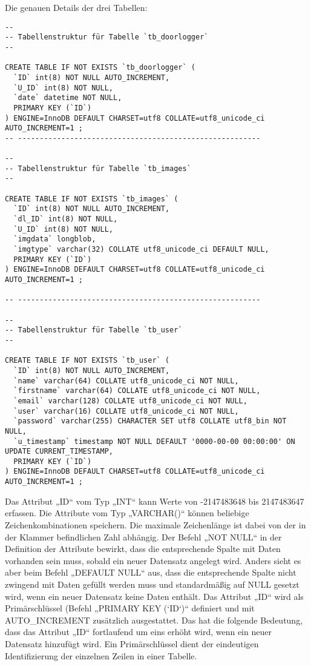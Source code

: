 Die genauen Details der drei Tabellen:
\begin{lstlisting}[caption={Aufbau der Datenbanktabellen},captionpos=b]
--
-- Tabellenstruktur für Tabelle `tb_doorlogger`
--

CREATE TABLE IF NOT EXISTS `tb_doorlogger` (
  `ID` int(8) NOT NULL AUTO_INCREMENT,
  `U_ID` int(8) NOT NULL,
  `date` datetime NOT NULL,
  PRIMARY KEY (`ID`)
) ENGINE=InnoDB DEFAULT CHARSET=utf8 COLLATE=utf8_unicode_ci AUTO_INCREMENT=1 ;
-- --------------------------------------------------------

--
-- Tabellenstruktur für Tabelle `tb_images`
--

CREATE TABLE IF NOT EXISTS `tb_images` (
  `ID` int(8) NOT NULL AUTO_INCREMENT,
  `dl_ID` int(8) NOT NULL,
  `U_ID` int(8) NOT NULL,
  `imgdata` longblob,
  `imgtype` varchar(32) COLLATE utf8_unicode_ci DEFAULT NULL,
  PRIMARY KEY (`ID`)
) ENGINE=InnoDB DEFAULT CHARSET=utf8 COLLATE=utf8_unicode_ci AUTO_INCREMENT=1 ;

-- --------------------------------------------------------

--
-- Tabellenstruktur für Tabelle `tb_user`
--

CREATE TABLE IF NOT EXISTS `tb_user` (
  `ID` int(8) NOT NULL AUTO_INCREMENT,
  `name` varchar(64) COLLATE utf8_unicode_ci NOT NULL,
  `firstname` varchar(64) COLLATE utf8_unicode_ci NOT NULL,
  `email` varchar(128) COLLATE utf8_unicode_ci NOT NULL,
  `user` varchar(16) COLLATE utf8_unicode_ci NOT NULL,
  `password` varchar(255) CHARACTER SET utf8 COLLATE utf8_bin NOT NULL,
  `u_timestamp` timestamp NOT NULL DEFAULT '0000-00-00 00:00:00' ON UPDATE CURRENT_TIMESTAMP,
  PRIMARY KEY (`ID`)
) ENGINE=InnoDB DEFAULT CHARSET=utf8 COLLATE=utf8_unicode_ci AUTO_INCREMENT=1 ;

\end{lstlisting}
Das Attribut „ID“ vom Typ „INT“ kann Werte von  -2147483648 bis 2147483647 erfassen. Die Attribute vom Typ „VARCHAR()“ können beliebige Zeichenkombinationen speichern. Die maximale Zeichenlänge ist dabei von der in der Klammer befindlichen Zahl abhängig. Der Befehl „NOT NULL“ in der Definition der Attribute bewirkt, dass die entsprechende Spalte mit Daten vorhanden sein muss, sobald ein neuer Datensatz angelegt wird. Anders sieht es aber beim Befehl „DEFAULT NULL“ aus, dass die entsprechende Spalte nicht zwingend mit Daten gefüllt werden muss und standardmäßig auf NULL gesetzt wird, wenn ein neuer Datensatz keine Daten enthält. Das Attribut „ID“ wird als Primärschlüssel (Befehl „PRIMARY KEY (`ID`)“ definiert und mit AUTO\_INCREMENT zusätzlich ausgestattet. Das hat die folgende Bedeutung, dass das Attribut „ID“ fortlaufend um eins erhöht wird, wenn ein neuer Datensatz hinzufügt wird. Ein Primärschlüssel dient der eindeutigen Identifizierung der einzelnen Zeilen in einer Tabelle. 

